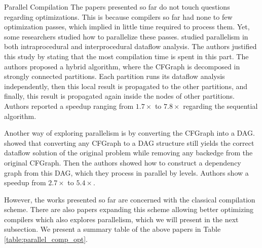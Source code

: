 \begin{section}{Parallel Compilation}
The papers presented so far do not touch questions regarding optimizations.
This is because compilers so far had none to few optimization passes, which
implied in little time required to process them. Yet, some researchers studied
how to parallelize these passes. \cite{Lee1994} studied parallelism in both
intraprocedural and interprocedural dataflow analysis. The authors justified this
study by stating that the most compilation time is spent in this part. The
authors proposed a hybrid algorithm, where the CFGraph is decomposed in
strongly connected partitions. Each partition runs its dataflow analysis
independently, then this local result is propagated to the other partitions,
and finally, this result is propagated again inside the nodes of other
partitions. Authors reported a speedup ranging from $1.7\times$ to $7.8\times$
regarding the sequential algorithm.

Another way of exploring parallelism is by converting the CFGraph into a DAG.
\cite{kramer1994combining} showed that converting any CFGraph to a DAG
structure still yields the correct dataflow solution of the original problem
while removing any backedge from the original CFGraph. Then the authors showed
how to construct a dependency graph from this DAG, which they process in
parallel by levels. Authors show a speedup from $2.7\times$ to $5.4\times$.


However, the works presented so far are concerned with the classical
compilation scheme. There are also papers expanding this scheme allowing better
optimizing compilers which also explores parallelism, which we will present in
the next subsection. We present a summary table of the above papers in
Table \ref{table:parallel_comp_opt}.


\end{section}
